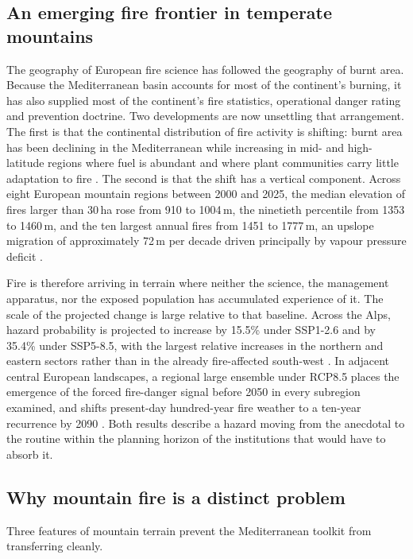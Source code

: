 \documentclass[11pt,a4paper]{article}
\begin{document}
\subsection{An emerging fire frontier in temperate mountains}

The geography of European fire science has followed the geography of burnt area. Because the Mediterranean basin accounts for most of the continent's burning, it has also supplied most of the continent's fire statistics, operational danger rating and prevention doctrine. Two developments are now unsettling that arrangement. The first is that the continental distribution of fire activity is shifting: burnt area has been declining in the Mediterranean while increasing in mid- and high-latitude regions where fuel is abundant and where plant communities carry little adaptation to fire \citep{miller_compounding_2025}. The second is that the shift has a vertical component. Across eight European mountain regions between 2000 and 2025, the median elevation of fires larger than 30\,ha rose from 910 to 1004\,m, the ninetieth percentile from 1353 to 1460\,m, and the ten largest annual fires from 1451 to 1777\,m, an upslope migration of approximately 72\,m per decade driven principally by vapour pressure deficit \citep{beloiu_climatedriven_2026}.

Fire is therefore arriving in terrain where neither the science, the management apparatus, nor the exposed population has accumulated experience of it. The scale of the projected change is large relative to that baseline. Across the Alps, hazard probability is projected to increase by 15.5\% under SSP1-2.6 and by 35.4\% under SSP5-8.5, with the largest relative increases in the northern and eastern sectors rather than in the already fire-affected south-west \citep{gerberding_mapping_2025}. In adjacent central European landscapes, a regional large ensemble under RCP8.5 places the emergence of the forced fire-danger signal before 2050 in every subregion examined, and shifts present-day hundred-year fire weather to a ten-year recurrence by 2090 \citep{miller_climate_2024}. Both results describe a hazard moving from the anecdotal to the routine within the planning horizon of the institutions that would have to absorb it.

\subsection{Why mountain fire is a distinct problem}

Three features of mountain terrain prevent the Mediterranean toolkit from transferring cleanly.
\end{document}
